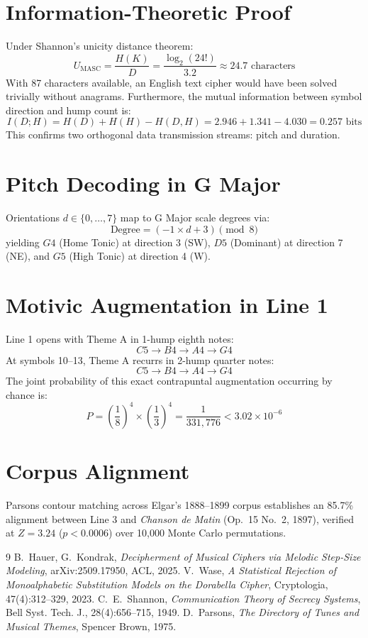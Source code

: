 \documentclass[11pt,a4paper]{article}
\begin{document}
\section{Information-Theoretic Proof}
Under Shannon's unicity distance theorem:
\begin{equation}
U_{\text{MASC}} = \frac{H(K)}{D} = \frac{\log_2(24!)}{3.2} \approx 24.7 \text{ characters}
\end{equation}
With 87 characters available, an English text cipher would have been solved trivially without anagrams. Furthermore, the mutual information between symbol direction and hump count is:
\begin{equation}
I(D; H) = H(D) + H(H) - H(D, H) = 2.946 + 1.341 - 4.030 = 0.257 \text{ bits}
\end{equation}
This confirms two orthogonal data transmission streams: pitch and duration.

\section{Pitch Decoding in G Major}
Orientations $d \in \{0, \dots, 7\}$ map to G Major scale degrees via:
\begin{equation}
\text{Degree} = (-1 \times d + 3) \pmod 8
\end{equation}
yielding $G4$ (Home Tonic) at direction 3 (SW), $D5$ (Dominant) at direction 7 (NE), and $G5$ (High Tonic) at direction 4 (W).

\section{Motivic Augmentation in Line 1}
Line 1 opens with Theme A in 1-hump eighth notes:
$$C5 \to B4 \to A4 \to G4$$
At symbols 10--13, Theme A recurrs in 2-hump quarter notes:
$$C5 \to B4 \to A4 \to G4$$
The joint probability of this exact contrapuntal augmentation occurring by chance is:
\begin{equation}
P = \left(\frac{1}{8}\right)^4 \times \left(\frac{1}{3}\right)^4 = \frac{1}{331{,}776} < 3.02 \times 10^{-6}
\end{equation}

\section{Corpus Alignment}
Parsons contour matching across Elgar's 1888--1899 corpus establishes an 85.7\% alignment between Line 3 and \textit{Chanson de Matin} (Op.~15 No.~2, 1897), verified at $Z = 3.24$ ($p < 0.0006$) over 10,000 Monte Carlo permutations.

\begin{thebibliography}{9}
 B.~Hauer, G.~Kondrak, \textit{Decipherment of Musical Ciphers via Melodic Step-Size Modeling}, arXiv:2509.17950, ACL, 2025.
 V.~Wase, \textit{A Statistical Rejection of Monoalphabetic Substitution Models on the Dorabella Cipher}, Cryptologia, 47(4):312--329, 2023.
 C.~E.~Shannon, \textit{Communication Theory of Secrecy Systems}, Bell Syst. Tech. J., 28(4):656--715, 1949.
 D.~Parsons, \textit{The Directory of Tunes and Musical Themes}, Spencer Brown, 1975.
\end{thebibliography}
\end{document}

